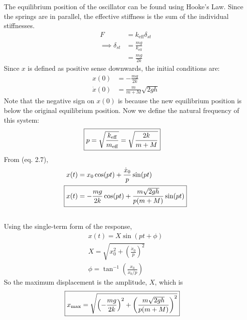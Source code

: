 The equilibrium position of the oscillator can be found using Hooke's Law. Since the springs are in parallel, the effective stiffness is the sum of the individual stiffnesses.
\begin{align*}
    F &= k_{\text{eff}} \delta_{st} \\
    \implies \delta_{st} &= \frac{mg}{k_{\text{eff}}} \\
    &= \frac{mg}{2k}
\end{align*}
Since $x$ is defined as positive sense downwards, the initial conditions are:
\begin{align*}
    x(0) &= -\frac{mg}{2k} \\
    \dot{x}(0) &= \frac{m}{m + M} \sqrt{2 g h}
\end{align*}
Note that the negative sign on $x(0)$ is because the new equilibrium position is below the original equilibrium position. Now we define the natural frequency of this system:
\begin{align*}
    \Aboxed{p = \sqrt{\frac{k_{\text{eff}}}{m_{\text{eff}}}} = \sqrt{\frac{2k}{m + M}}}
\end{align*}
From (eq. 2.7), 
\begin{align*}
    x(t) &= x_0 \cos (pt) + \frac{\dot{x}_0}{p} \sin (pt) \\
    \Aboxed{x(t) &= -\frac{mg}{2k} \cos (pt) + \frac{m\sqrt{2gh}}{p(m + M)} \sin (pt)}
\end{align*}

\subsection{}
Using the single-term form of the response, 
\begin{gather*}
    x(t) = X \sin (pt + \phi) \\
    X = \sqrt{x_0^2 + \left(\frac{\dot{x}_0}{p}\right)^2} \\
    \phi = \tan^{-1} \left(\frac{x_0}{\dot{x}_0 / p}\right)
\end{gather*}
So the maximum displacement is the amplitude, $X$, which is
\begin{align*}
    \Aboxed{x_{\text{max}} &= \sqrt{\left(-\frac{mg}{2k}\right)^2 + \left(\frac{m\sqrt{2gh}}{p(m + M)}\right)^2}}
\end{align*}